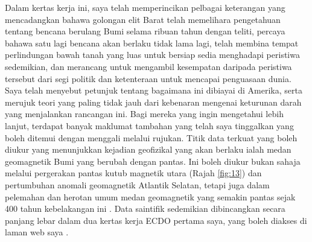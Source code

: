 \documentclass[10pt,twocolumn,letterpaper]{article}
\begin{document}
Dalam kertas kerja ini, saya telah memperincikan pelbagai keterangan yang mencadangkan bahawa golongan elit Barat telah memelihara pengetahuan tentang bencana berulang Bumi selama ribuan tahun dengan teliti, percaya bahawa satu lagi bencana akan berlaku tidak lama lagi, telah membina tempat perlindungan bawah tanah yang luas untuk bersiap sedia menghadapi peristiwa sedemikian, dan merancang untuk mengambil kesempatan daripada peristiwa tersebut dari segi politik dan ketenteraan untuk mencapai penguasaan dunia. Saya telah menyebut petunjuk tentang bagaimana ini dibiayai di Amerika, serta merujuk teori yang paling tidak jauh dari kebenaran mengenai keturunan darah yang menjalankan rancangan ini. Bagi mereka yang ingin mengetahui lebih lanjut, terdapat banyak maklumat tambahan yang telah saya tinggalkan yang boleh ditemui dengan menggali melalui rujukan.
Titik data terkuat yang boleh diukur yang menunjukkan kejadian geofizikal yang akan berlaku ialah medan geomagnetik Bumi yang berubah dengan pantas. Ini boleh diukur bukan sahaja melalui pergerakan pantas kutub magnetik utara (Rajah \ref{fig:13}) dan pertumbuhan anomali geomagnetik Atlantik Selatan, tetapi juga dalam pelemahan dan herotan umum medan geomagnetik yang semakin pantas sejak 400 tahun kebelakangan ini \cite{3}. Data saintifik sedemikian dibincangkan secara panjang lebar dalam dua kertas kerja ECDO pertama saya, yang boleh diakses di laman web saya \cite{3}.
\end{document}
